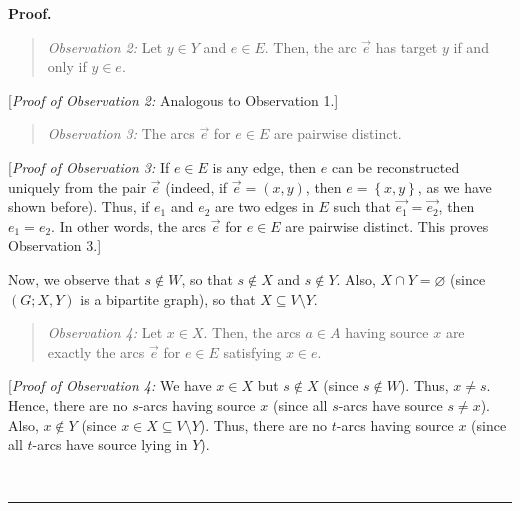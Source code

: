\documentclass[numbers=enddot,12pt,final,onecolumn,notitlepage]{scrartcl}%
\theoremstyle{definition}
\newenvironment{statement}{\begin{quote}}{\end{quote}}
\newenvironment{proof}[1][Proof]{\noindent\textbf{#1.} }{\ \rule{0.5em}{0.5em}}
\begin{document}
\begin{proof}
\begin{statement}
\textit{Observation 2:} Let $y\in Y$ and $e\in E$. Then, the arc
$\overrightarrow{e}$ has target $y$ if and only if $y\in e$.
\end{statement}

[\textit{Proof of Observation 2:} Analogous to Observation 1.]

\begin{statement}
\textit{Observation 3:} The arcs $\overrightarrow{e}$ for $e\in E$ are
pairwise distinct.
\end{statement}

[\textit{Proof of Observation 3:} If $e\in E$ is any edge, then $e$ can be
reconstructed uniquely from the pair $\overrightarrow{e}$ (indeed, if
$\overrightarrow{e}=\left(  x,y\right)  $, then $e=\left\{  x,y\right\}  $, as
we have shown before). Thus, if $e_{1}$ and $e_{2}$ are two edges in $E$ such
that $\overrightarrow{e_{1}}=\overrightarrow{e_{2}}$, then $e_{1}=e_{2}$. In
other words, the arcs $\overrightarrow{e}$ for $e\in E$ are pairwise distinct.
This proves Observation 3.]

Now, we observe that $s\notin W$, so that $s\notin X$ and $s\notin Y$. Also,
$X\cap Y=\varnothing$ (since $\left(  G;X,Y\right)  $ is a bipartite graph),
so that $X\subseteq V\setminus Y$.

\begin{statement}
\textit{Observation 4:} Let $x\in X$. Then, the arcs $a\in A$ having source
$x$ are exactly the arcs $\overrightarrow{e}$ for $e\in E$ satisfying $x\in e$.
\end{statement}

[\textit{Proof of Observation 4:} We have $x\in X$ but $s\notin X$ (since
$s\notin W$). Thus, $x\neq s$. Hence, there are no $s$-arcs having source $x$
(since all $s$-arcs have source $s\neq x$). Also, $x\notin Y$ (since $x\in
X\subseteq V\setminus Y$). Thus, there are no $t$-arcs having source $x$
(since all $t$-arcs have source lying in $Y$).


\end{proof}
\end{document}
